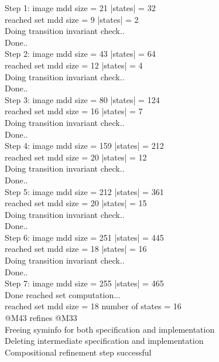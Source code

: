 {Step 1: image mdd size =         21	 |states| =       32	 \\
reached set mdd size =          9	 |states| =        2 \\
Doing transition invariant check.. \\
Done.. \\
Step 2: image mdd size =         43	 |states| =       64	 \\
reached set mdd size =         12	 |states| =        4 \\
Doing transition invariant check.. \\
Done.. \\
Step 3: image mdd size =         80	 |states| =      124	 \\
reached set mdd size =         16	 |states| =        7 \\
Doing transition invariant check.. \\
Done.. \\
Step 4: image mdd size =        159	 |states| =      212	 \\
reached set mdd size =         20	 |states| =       12 \\
Doing transition invariant check.. \\
Done.. \\
Step 5: image mdd size =        212	 |states| =      361	 \\
reached set mdd size =         20	 |states| =       15 \\
Doing transition invariant check.. \\
Done.. \\
Step 6: image mdd size =        251	 |states| =      445	 \\
reached set mdd size =         18	 |states| =       16 \\
Doing transition invariant check.. \\
Done.. \\
Step 7: image mdd size =        255	 |states| =      465	 \\
Done reached set computation... \\
reached set mdd size =         18	 number of states =       16 \\
@M43 refines @M33 \\
Freeing syminfo for both specification and implementation \\
Deleting intermediate specification and implementation \\
Compositional refinement step successful \\
}
